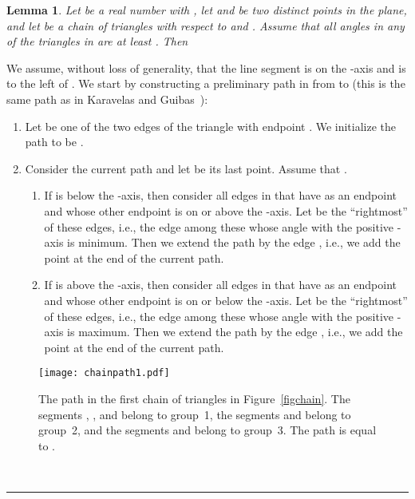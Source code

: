\documentclass[12pt]{article}
\newtheorem{lemma}{Lemma}
\newcommand{\qed}{\rule{0.5em}{1.5ex}}
\newcommand{\fqed}{{\hfill~\qed}}
\newenvironment{proof}{{\noindent \bf Proof.}}
                      {{\hfill \fqed} \vspace{1em}}
\begin{document}
\begin{lemma}
\label{lemchain}  
Let  be a real number with , let  and  
be two distinct points in the plane, and let  be a 
chain of triangles with respect to  and . Assume that all angles 
in any of the triangles in  are at least . Then 

\end{lemma} 
\begin{proof}
We assume, without loss of generality, that the line segment  is 
on the -axis and  is to the left of . We start by constructing 
a preliminary path in  from  to  (this is the 
same path as in Karavelas and Guibas~\cite{kg-skgsa-01}): 
\begin{enumerate} 
\item Let  be one of the two edges of the triangle  with 
      endpoint . We initialize the path to be . 
\item Consider the current path and let  be its last point. 
      Assume that . 
      \begin{enumerate} 
      \item If  is below the -axis, then consider all edges in  
             that have  as an endpoint and whose other 
            endpoint is on or above the -axis. Let  be the 
            ``rightmost'' of these edges, i.e., the edge among these 
            whose angle with the positive -axis is minimum. Then we 
            extend the path by the edge , i.e., we add the point 
             at the end of the current path.
      \item If  is above the -axis, then consider all edges in 
             that have  as an endpoint and whose other 
            endpoint is on or below the -axis. Let  be the 
            ``rightmost'' of these edges, i.e., the edge among these 
            whose angle with the positive -axis is maximum. Then we 
            extend the path by the edge , i.e., we add the point 
             at the end of the current path.
      \end{enumerate} 
\end{enumerate} 

\begin{figure}
\begin{center}
\texttt{[image: chainpath1.pdf]}
\end{center}
\caption{The path  in the first chain of 
         triangles in Figure~\ref{figchain}. The segments , 
         , and  belong to group~1, the segments 
          and  belong to group~2, and the segments 
          and  belong to group~3. The path  
         is equal to .}
\label{figchainpath}
\end{figure}


\end{proof}
\end{document}
